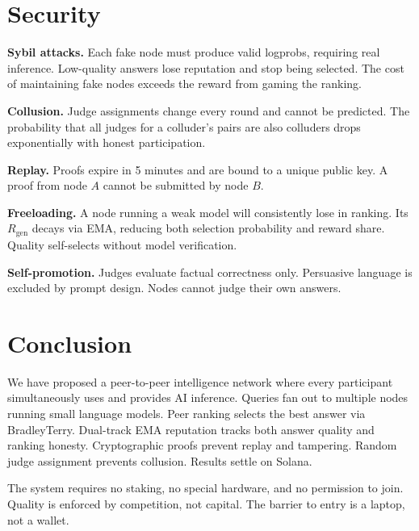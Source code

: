\documentclass[11pt,a4paper]{article}
\begin{document}
\section{Security}

\textbf{Sybil attacks.} Each fake node must produce valid logprobs, requiring real inference. Low-quality answers lose reputation and stop being selected. The cost of maintaining fake nodes exceeds the reward from gaming the ranking.

\textbf{Collusion.} Judge assignments change every round and cannot be predicted. The probability that all judges for a colluder's pairs are also colluders drops exponentially with honest participation.

\textbf{Replay.} Proofs expire in 5 minutes and are bound to a unique public key. A proof from node $A$ cannot be submitted by node $B$.

\textbf{Freeloading.} A node running a weak model will consistently lose in ranking. Its $R_{\text{gen}}$ decays via EMA, reducing both selection probability and reward share. Quality self-selects without model verification.

\textbf{Self-promotion.} Judges evaluate factual correctness only. Persuasive language is excluded by prompt design. Nodes cannot judge their own answers.

\section{Conclusion}

We have proposed a peer-to-peer intelligence network where every participant simultaneously uses and provides AI inference. Queries fan out to multiple nodes running small language models. Peer ranking selects the best answer via BradleyTerry. Dual-track EMA reputation tracks both answer quality and ranking honesty. Cryptographic proofs prevent replay and tampering. Random judge assignment prevents collusion. Results settle on Solana.

The system requires no staking, no special hardware, and no permission to join. Quality is enforced by competition, not capital. The barrier to entry is a laptop, not a wallet.
\end{document}
